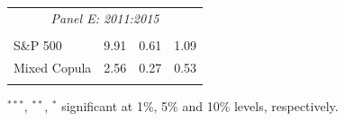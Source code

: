 \documentclass[pdf,10pt,xcolor=dvipsnames,hide notes]{beamer}
\newcommand{\backupend}{
	\setcounter{framenumber}{\value{finalframe}}
}
\begin{document}
\begin{frame}
\begin{threeparttable}[H]
\begin{tabularx}{\textwidth}{@{\extracolsep{\fill}}llll@{}}
	\multicolumn{4}{c}{\textit{Panel E: 2011:2015}} \\
	&       &       &       \\
	S\&P 500 & 9.91  & 0.61  & 1.09 \\
	Mixed Copula & 2.56  & 0.27  & 0.53 \\
	\multicolumn{1}{r}{} & \multicolumn{1}{r}{} & \multicolumn{1}{r}{} & \multicolumn{1}{r}{} \\
	\bottomrule
\end{tabularx}%
\begin{tablenotes}
	\item \scriptsize $^{\ast\ast\ast}$, $^{\ast\ast}$, $^{\ast}$  significant at 1\%, 5\% and 10\% levels, respectively.
\end{tablenotes}
\label{tab:table111}%
\end{threeparttable}%

\end{frame}

\backupend
\end{document}
